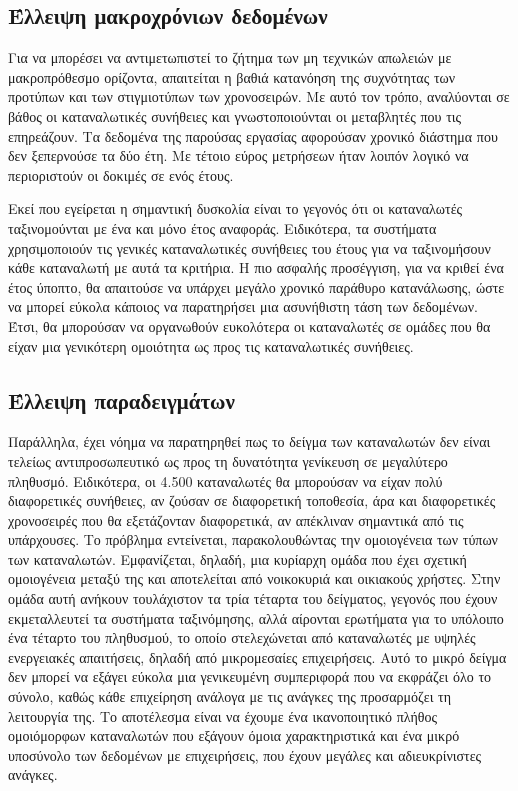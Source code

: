 \subsection{Έλλειψη μακροχρόνιων δεδομένων}
Για να μπορέσει να αντιμετωπιστεί το ζήτημα των μη τεχνικών απωλειών με μακροπρόθεσμο ορίζοντα, απαιτείται η βαθιά κατανόηση της συχνότητας των προτύπων και των στιγμιοτύπων των χρονοσειρών. Με αυτό τον τρόπο, αναλύονται σε βάθος οι καταναλωτικές συνήθειες και γνωστοποιούνται οι μεταβλητές που τις επηρεάζουν. Τα δεδομένα της παρούσας εργασίας αφορούσαν χρονικό διάστημα που δεν ξεπερνούσε τα δύο έτη. Με τέτοιο εύρος μετρήσεων ήταν λοιπόν λογικό να περιοριστούν οι δοκιμές σε ενός έτους.\par
Εκεί που εγείρεται η σημαντική δυσκολία είναι το γεγονός ότι οι καταναλωτές ταξινομούνται με ένα και μόνο έτος αναφοράς. Ειδικότερα, τα συστήματα χρησιμοποιούν τις γενικές καταναλωτικές συνήθειες του έτους για να ταξινομήσουν κάθε καταναλωτή με αυτά τα κριτήρια. Η πιο ασφαλής προσέγγιση, για να κριθεί ένα έτος ύποπτο, θα απαιτούσε να υπάρχει μεγάλο χρονικό παράθυρο κατανάλωσης, ώστε να μπορεί εύκολα κάποιος να παρατηρήσει μια ασυνήθιστη τάση των δεδομένων. Έτσι, θα μπορούσαν να οργανωθούν ευκολότερα οι καταναλωτές σε ομάδες που θα είχαν μια γενικότερη ομοιότητα ως προς τις καταναλωτικές συνήθειες.
\subsection{Έλλειψη παραδειγμάτων}
Παράλληλα, έχει νόημα να παρατηρηθεί πως το δείγμα των καταναλωτών δεν είναι τελείως αντιπροσωπευτικό ως προς τη δυνατότητα γενίκευση σε μεγαλύτερο πληθυσμό. Ειδικότερα, οι 4.500 καταναλωτές θα μπορούσαν να είχαν πολύ διαφορετικές συνήθειες, αν ζούσαν σε διαφορετική τοποθεσία, άρα και διαφορετικές χρονοσειρές που θα εξετάζονταν διαφορετικά, αν απέκλιναν σημαντικά από τις υπάρχουσες. Το πρόβλημα εντείνεται, παρακολουθώντας την ομοιογένεια των τύπων των καταναλωτών. Εμφανίζεται, δηλαδή, μια κυρίαρχη ομάδα που έχει σχετική ομοιογένεια μεταξύ της και αποτελείται από νοικοκυριά και οικιακούς χρήστες. Στην ομάδα αυτή ανήκουν τουλάχιστον τα τρία τέταρτα του δείγματος, γεγονός που έχουν εκμεταλλευτεί  τα συστήματα ταξινόμησης, αλλά αίρονται ερωτήματα για το υπόλοιπο ένα τέταρτο του πληθυσμού, το οποίο στελεχώνεται από καταναλωτές με υψηλές ενεργειακές απαιτήσεις, δηλαδή από μικρομεσαίες επιχειρήσεις. Αυτό το μικρό δείγμα δεν μπορεί να εξάγει εύκολα μια γενικευμένη συμπεριφορά που να εκφράζει όλο το σύνολο, καθώς κάθε επιχείρηση ανάλογα με τις ανάγκες της προσαρμόζει τη λειτουργία της. Το αποτέλεσμα είναι να έχουμε ένα ικανοποιητικό πλήθος ομοιόμορφων καταναλωτών που εξάγουν όμοια χαρακτηριστικά και ένα μικρό υποσύνολο των δεδομένων με επιχειρήσεις, που έχουν μεγάλες και αδιευκρίνιστες ανάγκες.
